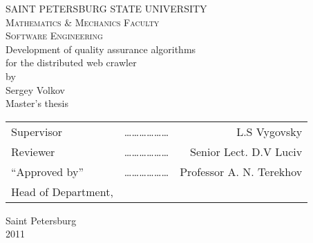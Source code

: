 \documentclass[a4paper,10pt]{report}
\begin{document}
\begin{titlepage}
\begin{center}
\begin{otherlanguage}{english}

\textsc{SAINT PETERSBURG STATE UNIVERSITY}\\
\textsc{Mathematics \& Mechanics Faculty}\\[1.0cm]

\textsc{Software Engineering}\\[3.0cm]

{ \LARGE Development of quality assurance algorithms}\\[1.0cm]

{ \LARGE for the distributed web crawler}\\[1.0cm]

{by \\ Sergey Volkov \\ Master’s thesis}\\[3.0cm]

\begin{tabular}{lcr}
Supervisor & ……………… & L.S Vygovsky \\[1.0cm]
Reviewer            & ……………… & Senior Lect. D.V Luciv\\[1.0cm]
``Approved by'' & ……………… & Professor A. N. Terekhov\\
Head of Department, & & \\
\end{tabular}

\vfill

{\large Saint Petersburg \\ 2011}

\end{otherlanguage}
\end{center}
\end{titlepage}

\tableofcontents






\end{document}
